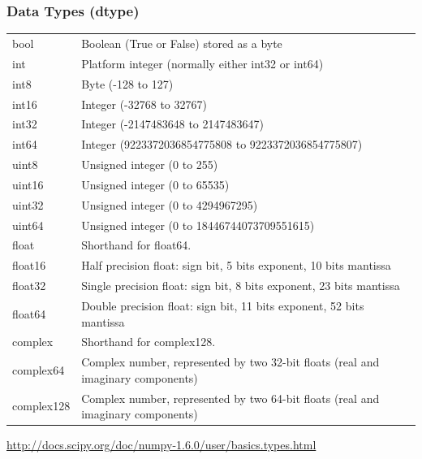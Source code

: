 \documentclass{beamer}
\begin{document}
\begin{frame}[fragile]
\frametitle{Data Types (dtype)}
\begin{table}
\tiny
\begin{tabular}{l l}
  bool        & Boolean (True or False) stored as a byte                                         \\
  int         & Platform integer (normally either int32 or int64)                                \\
  int8        & Byte (-128 to 127)                                                               \\
  int16       & Integer (-32768 to 32767)                                                        \\
  int32       & Integer (-2147483648 to 2147483647)                                              \\
  int64       & Integer (9223372036854775808 to 9223372036854775807)                             \\
  uint8       & Unsigned integer (0 to 255)                                                      \\
  uint16      & Unsigned integer (0 to 65535)                                                    \\
  uint32      & Unsigned integer (0 to 4294967295)                                               \\
  uint64      & Unsigned integer (0 to 18446744073709551615)                                     \\
  float       & Shorthand for float64.                                                           \\
  float16     & Half precision float: sign bit, 5 bits exponent, 10 bits mantissa                \\
  float32     & Single precision float: sign bit, 8 bits exponent, 23 bits mantissa              \\
  float64     & Double precision float: sign bit, 11 bits exponent, 52 bits mantissa             \\
  complex     & Shorthand for complex128.                                                        \\
  complex64   & Complex number, represented by two 32-bit floats (real and imaginary components) \\
  complex128  & Complex number, represented by two 64-bit floats (real and imaginary components) \\ 
\end{tabular}
\end{table}
\url{http://docs.scipy.org/doc/numpy-1.6.0/user/basics.types.html}
\end{frame}
\end{document}

